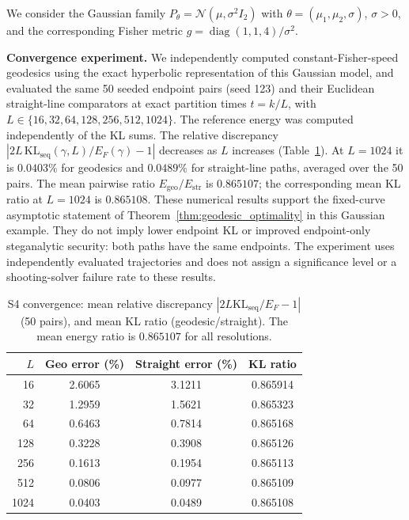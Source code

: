 \documentclass[a4paper,fleqn]{cas-dc}
\begin{document}
We consider the Gaussian family
$P_\theta=\mathcal{N}(\mu,\sigma^2 I_2)$ with
$\theta=(\mu_1,\mu_2,\sigma)$, $\sigma>0$, and the
corresponding Fisher metric
$g=\operatorname{diag}(1,1,4)/\sigma^2$.

\textbf{Convergence experiment.} We independently computed
constant-Fisher-speed geodesics using the exact hyperbolic representation
of this Gaussian model, and evaluated the same 50 seeded endpoint pairs
(seed 123) and their Euclidean straight-line comparators at exact
partition times $t=k/L$, with
$L\in\{16,32,64,128,256,512,1024\}$. The reference energy was
computed independently of the KL sums. The relative discrepancy
$\left|2L\,\mathrm{KL}_{\mathrm{seq}}(\gamma,L)/E_F(\gamma)-1\right|$
decreases as $L$ increases (Table~\ref{tab:s4}). At $L=1024$ it is
$0.0403\%$ for geodesics and $0.0489\%$ for straight-line paths,
averaged over the 50 pairs. The mean pairwise ratio
$E_{\mathrm{geo}}/E_{\mathrm{str}}$ is $0.865107$; the corresponding
mean KL ratio at $L=1024$ is $0.865108$. These numerical
results support the fixed-curve asymptotic statement of
Theorem~\ref{thm:geodesic_optimality} in this Gaussian example. They
do not imply lower endpoint KL or improved endpoint-only steganalytic
security: both paths have the same endpoints. The experiment uses independently evaluated trajectories and does not
assign a significance level or a shooting-solver failure rate to these results.

\begin{table}[ht]
\centering
\caption{S4 convergence: mean relative discrepancy $|2L\mathrm{KL}_{\mathrm{seq}}/E_F-1|$ (50 pairs), and mean KL ratio (geodesic/straight). The mean energy ratio is $0.865107$ for all resolutions.}
\label{tab:s4}
\small
\setlength{\tabcolsep}{3pt}
\begin{tabular}{rccc}
\toprule
$L$ & Geo error (\%) & Straight error (\%) & KL ratio \\
\midrule
16 & 2.6065 & 3.1211 & 0.865914 \\
32 & 1.2959 & 1.5621 & 0.865323 \\
64 & 0.6463 & 0.7814 & 0.865168 \\
128 & 0.3228 & 0.3908 & 0.865126 \\
256 & 0.1613 & 0.1954 & 0.865113 \\
512 & 0.0806 & 0.0977 & 0.865109 \\
1024 & 0.0403 & 0.0489 & 0.865108 \\
\bottomrule
\end{tabular}
\end{table}
\end{document}
